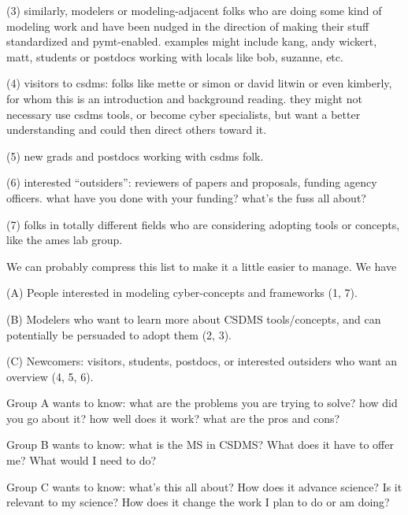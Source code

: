 \documentclass[12pt]{amsart}
\begin{document}
(3) similarly, modelers or modeling-adjacent folks who are doing some kind of modeling work and have been nudged in the direction of making their stuff standardized and pymt-enabled. examples might include kang, andy wickert, matt, students or postdocs working with locals like bob, suzanne, etc.

(4) visitors to csdms: folks like mette or simon or david litwin or even kimberly, for whom this is an introduction and background reading. they might not necessary use csdms tools, or become cyber specialists, but want a better understanding and could then direct others toward it.

(5) new grads and postdocs working with csdms folk.

(6) interested ``outsiders'': reviewers of papers and proposals, funding agency officers. what have you done with your funding? what's the fuss all about?

(7) folks in totally different fields who are considering adopting tools or concepts, like the ames lab group.

We can probably compress this list to make it a little easier to manage. We have

(A) People interested in modeling cyber-concepts and frameworks (1, 7).

(B) Modelers who want to learn more about CSDMS tools/concepts, and can potentially be persuaded to adopt them (2, 3).

(C) Newcomers: visitors, students, postdocs, or interested outsiders who want an overview (4, 5, 6).

Group A wants to know: what are the problems you are trying to solve? how did you go about it? how well does it work? what are the pros and cons?

Group B wants to know: what is the MS in CSDMS? What does it have to offer me? What would I need to do?

Group C wants to know: what's this all about? How does it advance science? Is it relevant to my science? How does it change the work I plan to do or am doing?
\end{document}
